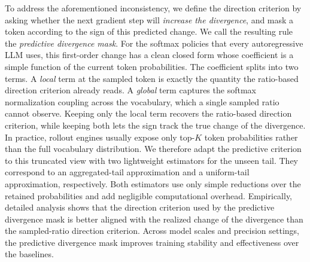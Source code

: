 To address the aforementioned inconsistency, we define the direction criterion by asking whether the next gradient
step will \emph{increase the divergence}, and mask a token according to the sign
of this predicted change.
We call the resulting rule the \emph{predictive divergence mask}.
For the softmax policies that every autoregressive LLM uses, this first-order
change has a clean closed form whose coefficient is a simple function of the
current token probabilities.
The coefficient splits into two terms.
A \emph{local} term at the sampled token is exactly the quantity the
ratio-based direction criterion already reads.
A \emph{global} term captures the softmax normalization coupling across the
vocabulary, which a single sampled ratio cannot observe.
Keeping only the local term recovers the ratio-based direction criterion, while
keeping both lets the sign track the true change of the divergence.
In practice, rollout engines usually expose only top-$K$ token probabilities
rather than the full vocabulary distribution.
We therefore adapt the predictive criterion to this truncated view with two
lightweight estimators for the unseen tail.
They correspond to an aggregated-tail approximation and a uniform-tail
approximation, respectively.
Both estimators use only simple reductions over the retained probabilities and
add negligible computational overhead.
Empirically, detailed analysis shows that the direction
criterion used by the predictive divergence mask is better aligned with the
realized change of the divergence than the sampled-ratio direction criterion.
Across model scales and precision settings, the predictive divergence mask
improves training stability and effectiveness over the baselines.
